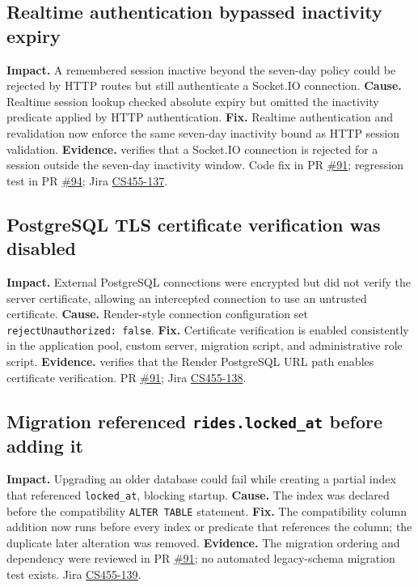 \documentclass[10pt]{article}
\begin{document}
\subsection{Realtime authentication bypassed inactivity expiry}
\textbf{Impact.} A remembered session inactive beyond the seven-day policy could be rejected by HTTP routes but still authenticate a Socket.IO connection.
\textbf{Cause.} Realtime session lookup checked absolute expiry but omitted the inactivity predicate applied by HTTP authentication.
\textbf{Fix.} Realtime authentication and revalidation now enforce the same seven-day inactivity bound as HTTP session validation.
\textbf{Evidence.}  verifies that a Socket.IO connection is rejected for a session outside the seven-day inactivity window. Code fix in PR \href{https://github.com/CS455-Carpooling/Campus_Ridepooling_Automation/pull/91}{\#91}; regression test in PR \href{https://github.com/CS455-Carpooling/Campus_Ridepooling_Automation/pull/94}{\#94}; Jira \href{https://cs455project.atlassian.net/browse/CS455-137}{CS455-137}.
\subsection{PostgreSQL TLS certificate verification was disabled}
\textbf{Impact.} External PostgreSQL connections were encrypted but did not verify the server certificate, allowing an intercepted connection to use an untrusted certificate.
\textbf{Cause.} Render-style connection configuration set \texttt{rejectUnauthorized: false}.
\textbf{Fix.} Certificate verification is enabled consistently in the application pool, custom server, migration script, and administrative role script.
\textbf{Evidence.}  verifies that the Render PostgreSQL URL path enables certificate verification. PR \href{https://github.com/CS455-Carpooling/Campus_Ridepooling_Automation/pull/91}{\#91}; Jira \href{https://cs455project.atlassian.net/browse/CS455-138}{CS455-138}.
\subsection{Migration referenced \texttt{rides.locked\_at} before adding it}
\textbf{Impact.} Upgrading an older database could fail while creating a partial index that referenced \texttt{locked\_at}, blocking startup.
\textbf{Cause.} The index was declared before the compatibility \texttt{ALTER TABLE} statement.
\textbf{Fix.} The compatibility column addition now runs before every index or predicate that references the column; the duplicate later alteration was removed.
\textbf{Evidence.} The migration ordering and dependency were reviewed in PR \href{https://github.com/CS455-Carpooling/Campus_Ridepooling_Automation/pull/91}{\#91}; no automated legacy-schema migration test exists. Jira \href{https://cs455project.atlassian.net/browse/CS455-139}{CS455-139}.
\end{document}
